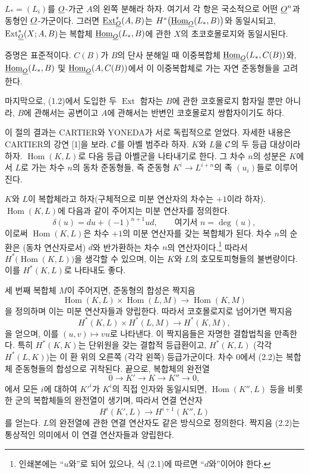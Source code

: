  $L_{*}=(L_i)$를
$\underline{O}$-가군 $A$의 왼쪽 분해라 하자. 여기서 각 항은 국소적으로 어떤
$\underline{O}^{n}$과 동형인 $\underline{O}$-가군이다. 그러면 $\underline{\operatorname{Ext}}_{\underline{O}}^{*}(A,B)$는
$H^{*}\bigl(\underline{\operatorname{Hom}}_{\underline{O}}(L_{*},B)\bigr)$와 동일시되고,
$\operatorname{Ext}_{\underline{O}}^{*}(X;A,B)$는 복합체
$\underline{\operatorname{Hom}}_{\underline{O}}(L_{*},B)$에 관한 $X$의 초코호몰로지와 동일시된다.

증명은 표준적이다. $C(B)$가 $B$의 단사 분해일 때 이중복합체
$\underline{\operatorname{Hom}}_{\underline{O}}(L_{*},C(B))$와, $\underline{\operatorname{Hom}}_{\underline{O}}(L_{*},B)$ 및
$\underline{\operatorname{Hom}}_{\underline{O}}(A,C(B))$에서 이 이중복합체로 가는 자연
준동형들을 고려한다.

마지막으로, (1.2)에서 도입한 두 $\operatorname{Ext}$ 함자는 $B$에 관한
코호몰로지 함자일 뿐만 아니라, $B$에 관해서는 공변이고 $A$에
관해서는 반변인 코호몰로지 쌍함자이기도 하다.


이 절의 결과는 CARTIER와 YONEDA가 서로 독립적으로 얻었다. 자세한
내용은 CARTIER의 강연 [1]을 보라. $\mathcal C$를 아벨 범주라 하자.
$K$와 $L$을 $\mathcal C$의 두 등급 대상이라 하자.
$\operatorname{Hom}(K,L)$로 다음 등급 아벨군을 나타내기로 한다. 그 차수
$n$의 성분은 $K$에서 $L$로 가는 차수 $n$의 동차 준동형들, 즉
준동형 $K^{i}\longrightarrow L^{i+n}$의 족 $(u_i)$들로 이루어진다.

$K$와 $L$이 복합체라고 하자(구체적으로 미분 연산자의 차수는 $+1$이라
하자). $\operatorname{Hom}(K,L)$에 다음과 같이 주어지는 미분
연산자를 정의한다.
\begin{equation}\tag{2.1}
  \delta(u)=du+(-1)^{n+1}ud,\qquad\text{여기서 }n=\deg(u),
\end{equation}
이로써 $\operatorname{Hom}(K,L)$은 차수 $+1$의 미분 연산자를 갖는
복합체가 된다. 차수 $n$의 순환은 (동차 연산자로서) $d$와 반가환하는
차수 $n$의 연산자이다.\footnote{인쇄본에는 “$u$와”로 되어 있으나, 식
(2.1)에 따르면 “$d$와”이어야 한다.} 따라서
$H^{*}\bigl(\operatorname{Hom}(K,L)\bigr)$을 생각할 수 있으며, 이는
$K$와 $L$의 호모토피형들의 불변량이다. 이를 $H^{*}(K,L)$로 나타내도 좋다.

세 번째 복합체 $M$이 주어지면, 준동형의 합성은 짝지음
\[
  \operatorname{Hom}(K,L)\times\operatorname{Hom}(L,M)
  \longrightarrow\operatorname{Hom}(K,M)
\]
을 정의하며 이는 미분 연산자들과 양립한다. 따라서 코호몰로지로
넘어가면 짝지음
\begin{equation}\tag{2.2}
  H^{*}(K,L)\times H^{*}(L,M)\longrightarrow H^{*}(K,M),
\end{equation}
을 얻으며, 이를 $(u,v)\longmapsto vu$로 나타낸다. 이 짝지음들은 자명한
결합법칙을 만족한다. 특히 $H^{*}(K,K)$는 단위원을 갖는 결합적
등급환이고, $H^{*}(K,L)$ (각각 $H^{*}(L,K)$)는 이 환 위의 오른쪽
(각각 왼쪽) 등급가군이다. 차수 $0$에서 (2.2)는 복합체 준동형들의
합성으로 귀착된다. 끝으로, 복합체의 완전열
\[
  0\longrightarrow K'\longrightarrow K\longrightarrow K''\longrightarrow 0,
\]
에서 모든 $i$에 대하여 $K'^{i}$가 $K^{i}$의 직접 인자와 동일시되면,
$\operatorname{Hom}(K'',L)$ 등을 비롯한 군의 복합체들의 완전열이
생기며, 따라서 연결 연산자
\[
  H^{i}(K',L)\longrightarrow H^{i+1}(K'',L)
\]
를 얻는다. $L$의 완전열에 관한 연결 연산자도 같은 방식으로 정의한다.
짝지음 (2.2)는 통상적인 의미에서 이 연결 연산자들과 양립한다.

